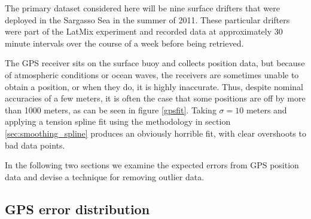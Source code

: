 \documentclass[10pt,journal]{IEEEtran}
\begin{document}
The primary dataset considered here will be nine surface drifters that were deployed in the Sargasso Sea in the summer of 2011. These particular drifters were part of the LatMix experiment \cite{shcherbina2015-bams} and recorded data at approximately 30 minute intervals over the course of a week before being retrieved.

The GPS receiver sits on the surface buoy and collects position data, but because of atmospheric conditions or ocean waves, the receivers are sometimes unable to obtain a position, or when they do, it is highly inaccurate. Thus, despite nominal accuracies of a few meters, it is often the case that some positions are off by more than 1000 meters, as can be seen in figure \ref{gpsfit}. Taking $\sigma=10$ meters and applying a tension spline fit using the methodology in section \ref{sec:smoothing_spline} produces an obviously horrible fit, with clear overshoots to bad data points.

In the following two sections we examine the expected errors from GPS position data and devise a technique for removing outlier data.

%
\subsection{GPS error distribution}
\label{gps_position_errors}
%
\end{document}
